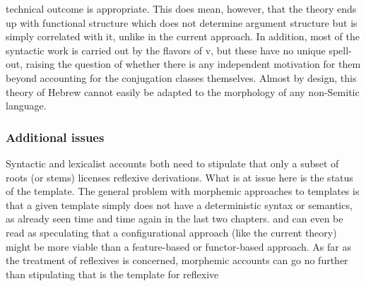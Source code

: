 \begin{exe}
\begin{xlist}
\begin{xlist}
\begin{exe}
\begin{xlist}
\begin{xlist}
\begin{exe}
\begin{xlist}
\begin{xlist}
\begin{exe}
\begin{exe}
\begin{xlist}
\begin{exe}
\begin{exe}
\begin{xlist}
\begin{exe}
\begin{exe}
\begin{exe}
\begin{exe}
\begin{exe}
\begin{xlist}
\begin{exe}
\begin{xlist}
\begin{exe}
\begin{exe}
\begin{xlist}
\begin{exe}
\begin{xlist}
\begin{exe}
\begin{xlist}
\begin{exe}
\begin{exe}
\begin{exe}
\begin{xlist}
\begin{exe}
\begin{exe}
\begin{exe}
\begin{xlist}
\begin{exe}
\begin{xlist}
\begin{exe}
\begin{xlist}
\begin{exe}
\begin{xlist}
\begin{exe}
\begin{exe}
\begin{exe}
\begin{exe}
\begin{xlist}
\begin{exe}
\begin{xlist}
\begin{exe}
\begin{xlist}
\begin{exe}
\begin{xlist}
\begin{exe}
\begin{xlist}
\begin{exe}
\begin{xlist}
\begin{exe}
\begin{exe}
\begin{exe}
\begin{exe}
\begin{xlist}
\begin{exe}
\begin{xlist}
\begin{exe}
\begin{xlist}
\begin{exe}
\begin{exe}
\begin{xlist}
\begin{exe}
\begin{xlist}
\begin{exe}
\begin{exe}
\begin{exe}
\begin{exe}
\begin{xlist}
\begin{xlist}
\begin{exe}
\begin{xlist}
\begin{exe}
\begin{exe}
\begin{exe}
\begin{xlist}
\begin{exe}
\begin{exe}
\begin{xlist}
\begin{exe}
\begin{exe}
\begin{exe}
\begin{xlist}
\begin{xlist}
\begin{exe}
\begin{xlist}
\begin{exe}
\begin{exe}
\begin{exe}
\begin{exe}
\begin{xlist}
\begin{exe}
\begin{xlist}
\begin{exe}
\begin{xlist}
\begin{exe}
\begin{xlist}
\begin{exe}
\begin{exe}
\begin{exe}
\begin{exe}
\begin{exe}
\begin{exe}
\begin{xlist}
\begin{exe}
\begin{xlist}
\begin{exe}
\begin{xlist}
\begin{exe}
\begin{xlist}
\begin{exe}
\begin{xlist}
\begin{exe}
\begin{xlist}
\begin{exe}
\begin{xlist}
\begin{exe}
\begin{xlist}
\begin{exe}
\begin{xlist}
technical outcome is appropriate. This does mean, however, that the theory ends up with functional structure which does not determine argument structure but is simply correlated with it, unlike in the current approach. In addition, most of the syntactic work is carried out by the flavors of v, but these have no unique spell-out, raising the question of whether there is any independent motivation for them beyond accounting for the conjugation classes themselves. Almost by design, this theory of Hebrew cannot easily be adapted to the morphology of any non-Semitic language.

		\subsubsection{Additional issues}
Syntactic and lexicalist accounts both need to stipulate that only a subset of roots (or stems) licenses reflexive derivations. What is at issue here is the status of the template. The general problem with morphemic approaches to templates is that a given template simply does not have a deterministic syntax or semantics, as already seen time and time again in the last two chapters. \citet[197]{arad05} and \citet[564]{borer13oup} can even be read as speculating that a configurational approach (like the current theory) might be more viable than a feature-based or functor-based approach. As far as the treatment of reflexives is concerned, morphemic accounts can go no further than stipulating that {\thit} is the template for reflexive 
\end{xlist}
\end{exe}
\end{xlist}
\end{exe}
\end{xlist}
\end{exe}
\end{xlist}
\end{exe}
\end{xlist}
\end{exe}
\end{xlist}
\end{exe}
\end{xlist}
\end{exe}
\end{xlist}
\end{exe}
\end{xlist}
\end{exe}
\end{exe}
\end{exe}
\end{exe}
\end{exe}
\end{exe}
\end{xlist}
\end{exe}
\end{xlist}
\end{exe}
\end{xlist}
\end{exe}
\end{xlist}
\end{exe}
\end{exe}
\end{exe}
\end{exe}
\end{xlist}
\end{exe}
\end{xlist}
\end{xlist}
\end{exe}
\end{exe}
\end{exe}
\end{xlist}
\end{exe}
\end{exe}
\end{xlist}
\end{exe}
\end{exe}
\end{exe}
\end{xlist}
\end{exe}
\end{xlist}
\end{xlist}
\end{exe}
\end{exe}
\end{exe}
\end{exe}
\end{xlist}
\end{exe}
\end{xlist}
\end{exe}
\end{exe}
\end{xlist}
\end{exe}
\end{xlist}
\end{exe}
\end{xlist}
\end{exe}
\end{exe}
\end{exe}
\end{exe}
\end{xlist}
\end{exe}
\end{xlist}
\end{exe}
\end{xlist}
\end{exe}
\end{xlist}
\end{exe}
\end{xlist}
\end{exe}
\end{xlist}
\end{exe}
\end{exe}
\end{exe}
\end{exe}
\end{xlist}
\end{exe}
\end{xlist}
\end{exe}
\end{xlist}
\end{exe}
\end{xlist}
\end{exe}
\end{exe}
\end{exe}
\end{xlist}
\end{exe}
\end{exe}
\end{exe}
\end{xlist}
\end{exe}
\end{xlist}
\end{exe}
\end{xlist}
\end{exe}
\end{exe}
\end{xlist}
\end{exe}
\end{xlist}
\end{exe}
\end{exe}
\end{exe}
\end{exe}
\end{exe}
\end{xlist}
\end{exe}
\end{exe}
\end{xlist}
\end{exe}
\end{exe}
\end{xlist}
\end{xlist}
\end{exe}
\end{xlist}
\end{xlist}
\end{exe}
\end{xlist}
\end{xlist}
\end{exe}

